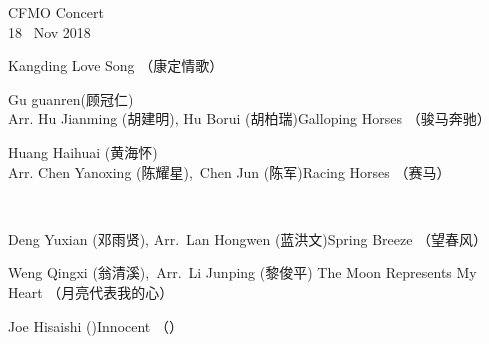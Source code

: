 \documentclass[letter,6pt,poets]{ConcProg}
\begin{document}
\begin{programme}{
    CFMO Concert
\\  {\normalsize 18 ~Nov 2018}
}
\begin{part}[]
\begin{composition}{}{}{Kangding Love Song  （康定情歌）}{}
    \end{composition}
    \begin{composition}{Gu guanren(顾冠仁)\\ Arr. Hu Jianming (胡建明), Hu Borui (胡柏瑞)}{}{Galloping Horses  （骏马奔驰）}{}
    \end{composition}
    \begin{composition}{Huang Haihuai (黄海怀)\\ Arr. Chen Yanoxing (陈耀星),\  Chen Jun (陈军)}{}{Racing Horses  （赛马）}{}
    \end{composition}\\
    \begin{composition}{Deng Yuxian (邓雨贤), Arr.\ Lan Hongwen (蓝洪文)}{}{Spring Breeze  （望春风）}{}
    \end{composition}
    \begin{composition}{Weng Qingxi (翁清溪),\ Arr.\ Li Junping (黎俊平) }{}{The Moon Represents My Heart  （月亮代表我的心）}{}
    \end{composition}
    \begin{composition}{Joe Hisaishi ()}{}{Innocent （） }{}
                   {}{}
    \end{composition}
    
    


%


\end{part}
\end{programme}
\end{document}
